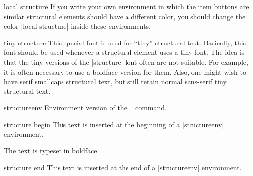 \begin{command}{\structure{}}
\begin{element}{local structure}
    If you write your own environment in which the item buttons are
    similar structural elements should have a different color, you
    should change the color |local structure| inside these
    environments. 
  \end{element}
  
  \begin{element}{tiny structure}\no\no\yes
    This special font is used for ``tiny'' structural text. Basically,
    this font should be used whenever a structural element uses a tiny
    font. The idea is that the tiny versions of the |structure| font
    often are not suitable. For example, it is often necessary to use a
    boldface version for them. Also, one might wish to have serif smallcaps
    structural text, but still retain normal sans-serif tiny structural
    text.
  \end{element}
\end{command}

\begin{environment}{{structureenv}}
  Environment version of the |\structure| command.

  \begin{element}{structure begin}\yes\no\no
    This text is inserted at the beginning of a |structureenv|
    environment.

    \begin{templateoptions}

      \articlenote
      The text is typeset in boldface.
    \end{templateoptions}
  \end{element}

  \begin{element}{structure end}\yes\no\no
    This text is inserted at the end of a |structureenv| environment.
  \end{element}
\end{environment}


